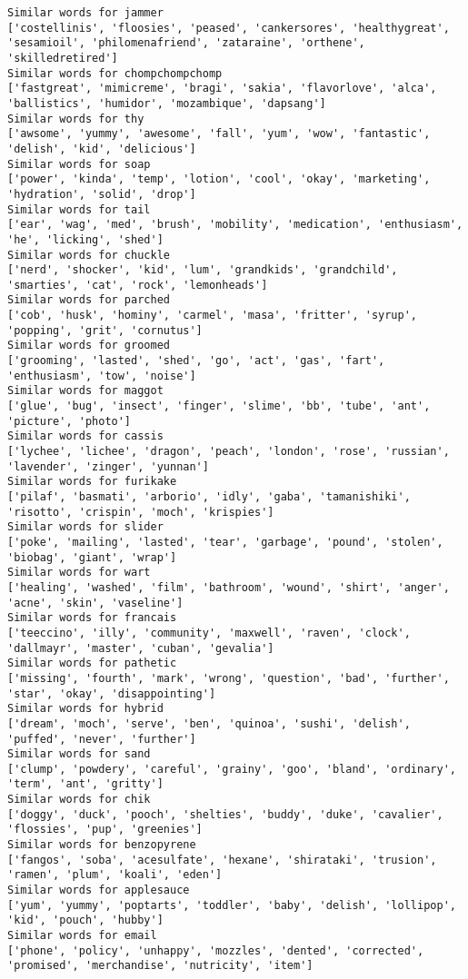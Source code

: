 \documentclass[11pt]{article}
\begin{document}
\begin{Verbatim}[commandchars=\\\{\}]
Similar words for jammer
['costellinis', 'floosies', 'peased', 'cankersores', 'healthygreat', 'sesamioil', 'philomenafriend', 'zataraine', 'orthene', 'skilledretired']
Similar words for chompchompchomp
['fastgreat', 'mimicreme', 'bragi', 'sakia', 'flavorlove', 'alca', 'ballistics', 'humidor', 'mozambique', 'dapsang']
Similar words for thy
['awsome', 'yummy', 'awesome', 'fall', 'yum', 'wow', 'fantastic', 'delish', 'kid', 'delicious']
Similar words for soap
['power', 'kinda', 'temp', 'lotion', 'cool', 'okay', 'marketing', 'hydration', 'solid', 'drop']
Similar words for tail
['ear', 'wag', 'med', 'brush', 'mobility', 'medication', 'enthusiasm', 'he', 'licking', 'shed']
Similar words for chuckle
['nerd', 'shocker', 'kid', 'lum', 'grandkids', 'grandchild', 'smarties', 'cat', 'rock', 'lemonheads']
Similar words for parched
['cob', 'husk', 'hominy', 'carmel', 'masa', 'fritter', 'syrup', 'popping', 'grit', 'cornutus']
Similar words for groomed
['grooming', 'lasted', 'shed', 'go', 'act', 'gas', 'fart', 'enthusiasm', 'tow', 'noise']
Similar words for maggot
['glue', 'bug', 'insect', 'finger', 'slime', 'bb', 'tube', 'ant', 'picture', 'photo']
Similar words for cassis
['lychee', 'lichee', 'dragon', 'peach', 'london', 'rose', 'russian', 'lavender', 'zinger', 'yunnan']
Similar words for furikake
['pilaf', 'basmati', 'arborio', 'idly', 'gaba', 'tamanishiki', 'risotto', 'crispin', 'moch', 'krispies']
Similar words for slider
['poke', 'mailing', 'lasted', 'tear', 'garbage', 'pound', 'stolen', 'biobag', 'giant', 'wrap']
Similar words for wart
['healing', 'washed', 'film', 'bathroom', 'wound', 'shirt', 'anger', 'acne', 'skin', 'vaseline']
Similar words for francais
['teeccino', 'illy', 'community', 'maxwell', 'raven', 'clock', 'dallmayr', 'master', 'cuban', 'gevalia']
Similar words for pathetic
['missing', 'fourth', 'mark', 'wrong', 'question', 'bad', 'further', 'star', 'okay', 'disappointing']
Similar words for hybrid
['dream', 'moch', 'serve', 'ben', 'quinoa', 'sushi', 'delish', 'puffed', 'never', 'further']
Similar words for sand
['clump', 'powdery', 'careful', 'grainy', 'goo', 'bland', 'ordinary', 'term', 'ant', 'gritty']
Similar words for chik
['doggy', 'duck', 'pooch', 'shelties', 'buddy', 'duke', 'cavalier', 'flossies', 'pup', 'greenies']
Similar words for benzopyrene
['fangos', 'soba', 'acesulfate', 'hexane', 'shirataki', 'trusion', 'ramen', 'plum', 'koali', 'eden']
Similar words for applesauce
['yum', 'yummy', 'poptarts', 'toddler', 'baby', 'delish', 'lollipop', 'kid', 'pouch', 'hubby']
Similar words for email
['phone', 'policy', 'unhappy', 'mozzles', 'dented', 'corrected', 'promised', 'merchandise', 'nutricity', 'item']

\end{Verbatim}
\end{document}
